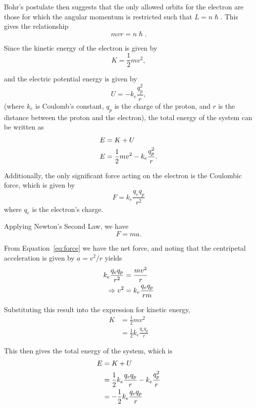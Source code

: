 \documentclass[twocolumn,english]{IEEEtran}
\theoremstyle{plain}
\theoremstyle{plain}
\begin{document}
Bohr's postulate then suggests that the only allowed orbits for the electron are those for which the angular momentum is restricted such that $L = n\hslash$. This gives the relationship
\begin{equation}\label{eq:mvr}
	mvr = n\hslash.
\end{equation}


Since the kinetic energy of the electron is given by
\begin{equation*}
	K = \frac{1}{2}mv^2,
\end{equation*}

and the electric potential energy is given by
\begin{equation*}
	U = -k_e \frac{q_p^2}{r},
\end{equation*}
(where $k_e$ is Coulomb's constant, $q_p$ is the charge of the proton, and $r$ is the distance between the proton and the electron), the total energy of the system can be written as
\begin{align}
	E &= K + U  \notag \\
	E &= \frac{1}{2}mv^2 - k_e \frac{q_p^2}{r}.
\end{align}


Additionally, the only significant force acting on the electron is the Coulombic force, which is given by
\begin{equation}\label{eq:force}
	F = k_e\frac{q_e q_p}{r^2}
\end{equation}
where $q_e$ is the electron's charge.



Applying Newton's Second Law, we have
\begin{equation*}
	F = ma.
\end{equation*}

From Equation~\ref{eq:force} we have the net force, and noting that the centripetal acceleration is given by $a = v^2/r$ yields
\begin{align}\label{eq:v2}
	k_e\frac{q_e q_p}{r^2} &= \frac{mv^2}{r} \notag \\
	\Rightarrow v^2 &= k_e\frac{q_e q_p}{rm}
\end{align}

Substituting this result into the expression for kinetic energy,
\begin{align*}
	K &= \frac{1}{2} m v^2 \\
	&=\frac{1}{2} k_e\frac{q_e q_p}{r}
\end{align*}

This then gives the total energy of the system, which is
\begin{align}\label{eq:energy}
	E &= K+U \notag \\
	&= \frac{1}{2} k_e\frac{q_e q_p}{r} - k_e \frac{q_p^2}{r} \notag \\
	&=  -\frac{1}{2} k_e\frac{q_e q_p}{r}
\end{align}
\end{document}
